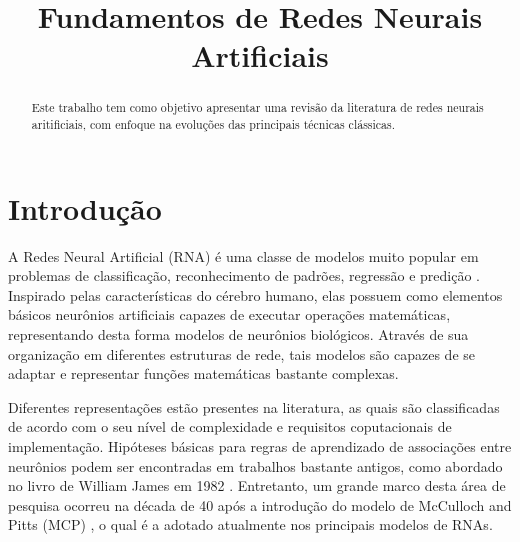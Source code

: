 \documentclass[conference]{IEEEtran}
\begin{document}
	
	\title{Fundamentos de Redes Neurais Artificiais}
	
	
	\author{
		}
	
	
	
	\maketitle
	
	\begin{abstract}
		Este trabalho tem como objetivo apresentar uma revisão da literatura de redes neurais aritificiais, com enfoque na evoluções das principais técnicas clássicas. 
	\end{abstract}

	\section{Introdução}
	A Redes Neural Artificial (RNA) é uma classe de modelos muito popular em problemas de classificação, reconhecimento de padrões, regressão e predição \cite{jain1996artificial}. Inspirado pelas características do cérebro humano, elas possuem como elementos básicos neurônios artificiais capazes de executar operações matemáticas, representando desta forma modelos de neurônios biológicos. Através de sua organização em diferentes estruturas de rede, tais modelos são capazes de se adaptar e representar funções matemáticas bastante complexas. 
	
	Diferentes representações estão presentes na literatura, as quais são classificadas de acordo com o seu nível de complexidade e requisitos coputacionais de implementação. Hipóteses básicas para regras de aprendizado de associações entre neurônios podem ser encontradas em trabalhos bastante antigos, como abordado no livro de William James em 1982 \cite{james1984psychology}. Entretanto, um grande marco desta área de pesquisa ocorreu na década de 40 após a introdução do modelo de McCulloch and Pitts (MCP) \cite{mcculloch1943logical}, o qual é a adotado atualmente nos principais modelos de RNAs.
	
\end{document}
